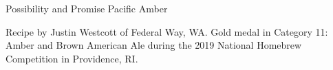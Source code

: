 \begin{recipe}{Possibility and Promise Pacific Amber} %

\begin{aboutblock}
Recipe by Justin Westcott of Federal Way, WA. Gold medal in Category
11: Amber and Brown American Ale during the 2019 National Homebrew
Competition in Providence, RI. \sourceaha
\end{aboutblock}


\begin{methodandtiming}
 
\begin{mashsteps}
\end{mashsteps}

\begin{fermentationsteps}
\end{fermentationsteps}

\end{methodandtiming}

\recipebreak

\begin{ingredientsblock}

\begin{malts}
\end{malts}

\begin{hops}
\end{hops}


\end{ingredientsblock}

\end{recipe}
